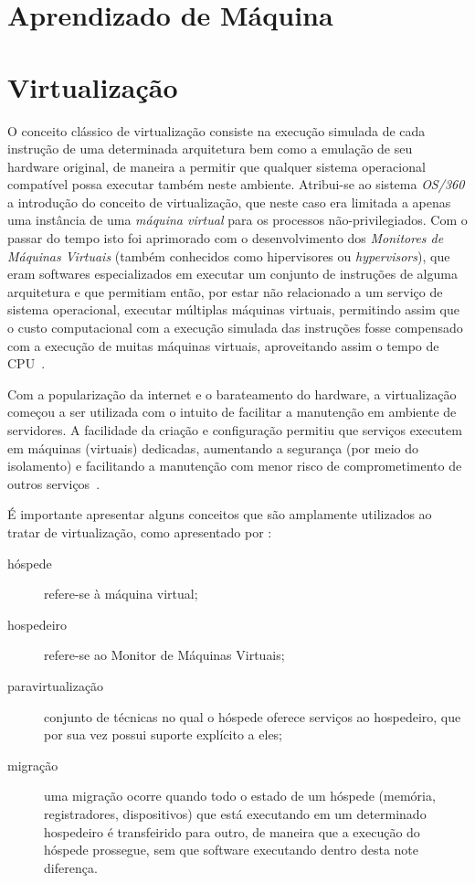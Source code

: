%
%

\chapter{Aprendizado de Máquina}\label{sec:aprendizado}



\chapter{Virtualização}\label{sec:virt}

O conceito clássico de virtualização consiste na execução simulada de cada
instrução de uma determinada arquitetura bem como a emulação de seu hardware
original, de maneira a permitir que qualquer sistema operacional compatível
possa executar também neste ambiente.  Atribui-se ao sistema \emph{OS/360} a
introdução do conceito de virtualização, que neste caso era limitada a apenas
uma instância de uma \emph{máquina virtual} para os processos
não-privilegiados. Com o passar do tempo isto foi aprimorado com o
desenvolvimento dos \emph{Monitores de Máquinas Virtuais} (também
conhecidos como hipervisores ou \emph{hypervisors}), que eram softwares
especializados em executar um conjunto de instruções de alguma arquitetura
e que permitiam então, por estar não relacionado a um serviço de sistema
operacional, executar múltiplas máquinas virtuais, permitindo assim que o
custo computacional com a execução simulada das instruções fosse compensado
com a execução de muitas máquinas virtuais, aproveitando assim o tempo de
CPU~\cite{goldberg1974survey}.

Com a popularização da internet e o barateamento do hardware, a
virtualização começou a ser utilizada com o intuito de facilitar a
manutenção em ambiente de servidores. A facilidade da criação e
configuração permitiu que serviços executem em máquinas (virtuais)
dedicadas, aumentando a segurança (por meio do isolamento) e facilitando a
manutenção com menor risco de comprometimento de outros
serviços~\cite{smith2005architecture}.

É importante apresentar alguns conceitos que são amplamente utilizados ao
tratar de virtualização, como apresentado por
:
\begin{description}
  \item[hóspede] refere-se à máquina virtual;
  \item[hospedeiro] refere-se ao Monitor de Máquinas Virtuais;
  \item[paravirtualização] conjunto de técnicas no qual o hóspede oferece
        serviços ao hospedeiro, que por sua vez possui suporte explícito a
        eles;
  \item[migração] uma migração ocorre quando todo o estado de um hóspede
       (memória, registradores, dispositivos) que está executando em um
       determinado hospedeiro é transfeirido para outro, de maneira que a
       execução do hóspede prossegue, sem que software executando dentro
       desta note diferença.
\end{description}

